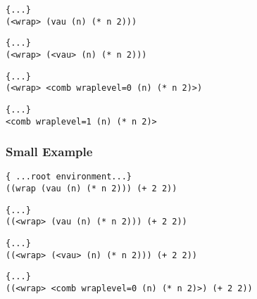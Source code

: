 \documentclass{beamer}
\begin{document}
\begin{frame}[fragile]
\footnotesize
\begin{verbatim}
{...}
(<wrap> (vau (n) (* n 2)))
\end{verbatim}
\end{frame}

\begin{frame}[fragile]
\footnotesize
\begin{verbatim}
{...}
(<wrap> (<vau> (n) (* n 2)))
\end{verbatim}
\end{frame}

\begin{frame}[fragile]
\footnotesize
\begin{verbatim}
{...}
(<wrap> <comb wraplevel=0 (n) (* n 2)>)
\end{verbatim}
\end{frame}

\begin{frame}[fragile]
\footnotesize
\begin{verbatim}
{...}
<comb wraplevel=1 (n) (* n 2)>
\end{verbatim}
\end{frame}

\begin{frame}[fragile]
\frametitle{Small Example}
\footnotesize
\begin{verbatim}
{ ...root environment...}
((wrap (vau (n) (* n 2))) (+ 2 2))
\end{verbatim}
\end{frame}

\begin{frame}[fragile]
\footnotesize
\begin{verbatim}
{...}
((<wrap> (vau (n) (* n 2))) (+ 2 2))
\end{verbatim}
\end{frame}

\begin{frame}[fragile]
\footnotesize
\begin{verbatim}
{...}
((<wrap> (<vau> (n) (* n 2))) (+ 2 2))
\end{verbatim}
\end{frame}

\begin{frame}[fragile]
\footnotesize
\begin{verbatim}
{...}
((<wrap> <comb wraplevel=0 (n) (* n 2)>) (+ 2 2))
\end{verbatim}
\end{frame}
\end{document}
